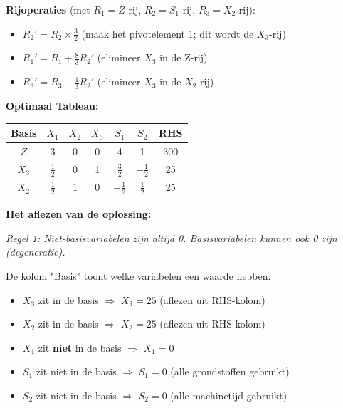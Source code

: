 \documentclass[a4paper,11pt]{article}
\begin{document}
\begin{oefenblok}
    \textbf{Rijoperaties} (met $R_1 = Z$-rij, $R_2 = S_1$-rij, $R_3 = X_2$-rij):
    \begin{itemize}
        \item $R_2' = R_2 \times \frac{3}{2}$ (maak het pivotelement 1; dit wordt de $X_3$-rij)
        \item $R_1' = R_1 + \frac{8}{3}R_2'$ (elimineer $X_3$ in de Z-rij)
        \item $R_3' = R_3 - \frac{1}{3}R_2'$ (elimineer $X_3$ in de $X_2$-rij)
    \end{itemize}

    \textbf{Optimaal Tableau:}

    \begin{center}
        \begin{tabular}{c|ccccc|c}
            \hline
            Basis & $X_1$         & $X_2$ & $X_3$ & $S_1$          & $S_2$          & RHS \\
            \hline
            $Z$   & 3             & 0     & 0     & 4              & 1              & 300 \\
            $X_3$ & $\frac{1}{2}$ & 0     & 1     & $\frac{3}{2}$  & $-\frac{1}{2}$ & 25  \\
            $X_2$ & $\frac{1}{2}$ & 1     & 0     & $-\frac{1}{2}$ & $\frac{1}{2}$  & 25  \\
            \hline
        \end{tabular}
    \end{center}

    \textbf{Het aflezen van de oplossing:}

    \textit{Regel 1: Niet-basisvariabelen zijn altijd 0. Basisvariabelen kunnen ook 0 zijn (degeneratie).}

    De kolom "Basis" toont welke variabelen een waarde hebben:
    \begin{itemize}
        \item $X_3$ zit in de basis $\Rightarrow$ $X_3 = 25$ (aflezen uit RHS-kolom)
        \item $X_2$ zit in de basis $\Rightarrow$ $X_2 = 25$ (aflezen uit RHS-kolom)
        \item $X_1$ zit \textbf{niet} in de basis $\Rightarrow$ $X_1 = 0$
        \item $S_1$ zit niet in de basis $\Rightarrow$ $S_1 = 0$ (alle grondstoffen gebruikt)
        \item $S_2$ zit niet in de basis $\Rightarrow$ $S_2 = 0$ (alle machinetijd gebruikt)
    \end{itemize}


\end{oefenblok}
\end{document}
